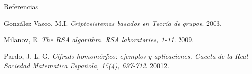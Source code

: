 \documentclass{beamer}
\begin{document}
\begin{frame}{Referencias}
\begin{thebibliography}{10}
	
	\beamertemplatearticlebibitems
          González Vasco, M.I.
          \emph{Criptosistemas basados en Teoría de grupos}.
          2003.

    \beamertemplatebookbibitems
          Milanov, E.
          \emph{The RSA algorithm. RSA laboratories, 1-11}.
          2009.

    \beamertemplatebookbibitems
          Pardo, J. L. G.
          \emph{Cifrado homomórfico: ejemplos y aplicaciones. Gaceta de la Real Sociedad Matematica Española, 15(4), 697-712}.
          20012.
          
\end{thebibliography}
\end{frame}
\end{document}
